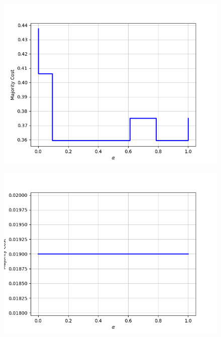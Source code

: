 \begin{figure}[h]
\begin{minipage}{.24\textwidth}
  {\includegraphics[width=\linewidth]{plots/nell-ac/personnorthamerica}}
\end{minipage}
\begin{minipage}{.24\textwidth}
  \centering
  {\includegraphics[width=\linewidth]{plots/nell-ac/physiologicalcondition}}
\end{minipage}
\begin{minipage}{.24\textwidth}
  \centering

\end{minipage}
\end{figure}
